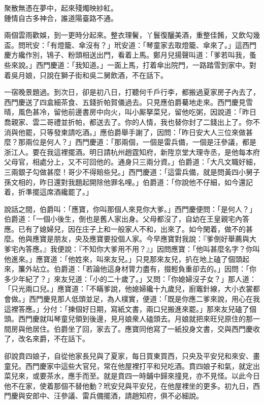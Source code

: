 \begin{myquote} 
聚散無憑在夢中，起來殘燭映紗紅。\\鍾情自古多神合，誰道陽臺路不通。
\end{myquote} 

兩個雲雨歡娛，到一更時分起來。整衣理鬢，丫鬟復釃美酒，重整佳餚，又飲勾幾盃。問玳安：「有燈籠、傘沒有？」玳安道：「琴童家去取燈籠、傘來了。」這西門慶方纔作別，鴇子、粉頭相送出門，看着上馬。鄭月兒揚聲叫道：「爹若叫我，蚤些來說。」西門慶道：「我知道。」一面上馬，打着傘出院門，一路踏雪到家中。對着吳月娘，只說在獅子街和吳二舅飲酒，不在話下。

一宿晚景題過。到次日，卻是初八日，打聽何千戶行李，都搬過夏家房子內去了，西門慶送了四盒細茶食、五錢折帕賀儀過去。只見應伯爵驀地走來。西門慶見雪晴，風色甚冷，留他前邊書房中向火，叫小厮拏菜兒，留他吃粥，因說道：「昨日喬親家、雲二哥禮並折帕，都送去了。你的人情，我也替你封了二錢出上了。你不消與他罷，只等發柬請吃酒。」應伯爵舉手謝了，因問：「昨日安大人三位來做甚麼？那兩位是何人？」西門慶道：「那兩個，一個是雷兵備，一個是汪參議，都是浙江人。要在我這裡擺酒。明日請杭州趙霆知府，新陞京堂大理寺丞，是他每本府父母官，相處分上，又不可回他的。通身只三兩分資。」伯爵道：「大凡文職好細，三兩銀子勾做甚麼！哥少不得賠些兒。」西門慶道：「這雷兵備，就是問黃四小舅子孫文相的，昨日還對我題起開除他罪名哩。」伯爵道：「你說他不仔細，如今還記着，折準擺這席酒纔罷了。」{}

說話之間，伯爵叫：「應寶，你叫那個人來見你大爹。」西門慶便問：「是何人？」伯爵道：「一個小後生，倒也是舊人家出身。父母都沒了，自幼在王皇親宅內答應。已有了媳婦兒，因在庄子上和一般家人不和，出來了。如今閑着，做不的甚麼。他與應寶是朋友，央及應寶要投個人家。今早應寶對我說：『爹倒好舉薦與大爹宅內答應。』我便說：『不知你大爹用不用？』」因問應寶：「他叫甚麼名字？你叫他進來。」應寶道：「他姓來，叫來友兒。」只見那來友兒，扒在地上磕了個頭起來，簾外站立。伯爵道：「若論他這身材膂力盡有，掇輕負重卻去的。」因問：「你多少年紀了？」來友兒道：「小的二十歲了。」又問：「你媳婦沒子女？」那人道：「只光兩口兒。」應寶道：「不瞞爹說，他媳婦纔十九歲兒，廚竈針線，大小衣裳都會做。」西門慶見那人低頭並足，為人樸實，便道：「既是你應二爹來說，用心在我這裡答應。」分付：「揀個好日期，寫紙文書，兩口兒搬進來罷。」那來友兒磕了個頭。西門慶就叫琴童兒領到後邊，見月娘衆人磕頭去。月娘就把來旺兒原住的那一間房與他居住。伯爵坐了回，家去了。應寶同他寫了一紙投身文書，交與西門慶收了，改名來爵，不在話下。

卻說賁四娘子，自從他家長兒與了夏家，每日買東買西，只央及平安兒和來安、畫童兒。西門慶家中這些大官兒，常在他屋裡打平和兒吃酒。賁四娘子和氣，就定出菜兒來，或要茶水，應手而至。就是賁四一時鋪中歸來撞見，亦不見怪。以此今日他不在家，使着那個不替他動？玳安兒與平安兒，在他屋裡坐的更多。初九日，西門慶與安郎中、汪參議、雷兵備擺酒，請趙知府，俱不必細說。

